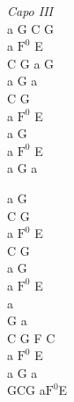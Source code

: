 \begin{chord}
    \textit{Capo III}\\
    a G C G\\
    a $\mathrm{F^{0}}$ E\\
    C G a G\\
    a G a\\
    C G\\
    a $\mathrm{F^{0}}$ E\\
    a G\\
    a $\mathrm{F^{0}}$ E\\
    a G a

    a G\\
    C G\\
    a $\mathrm{F^{0}}$ E\\
    C G\\
    a G\\
    a $\mathrm{F^{0}}$ E\\
    a\\
    G a\\
    C G F C\\
    a $\mathrm{F^{0}}$ E\\
    a G a\\
    GCG a$\mathrm{F^{0}}$E
\end{chord}

